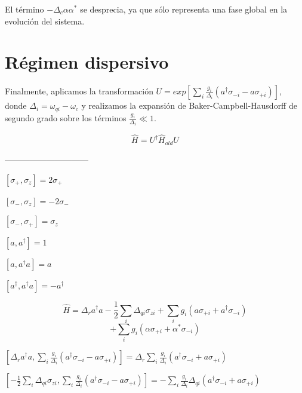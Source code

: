 \documentclass[11pt, spanish]{report}
\begin{document}
El término $-\Delta_c \alpha \alpha^*$ se desprecia, ya que sólo representa una fase global en la evolución del sistema.

\section{Régimen dispersivo}

Finalmente, aplicamos la transformación $U = exp[\sum\limits_i \frac{g_i}
{\Delta_i} (a^\dagger \sigma_{-i} - a \sigma_{+i})]$, donde $\Delta_i =
\omega_{qi} - \omega_c$ y realizamos la expansión de Baker-Campbell-Hausdorff de segundo grado sobre los términos $\frac{g_i}{\Delta_i} \ll 1$.

$$\hat{H} = U^\dagger \hat{H}_{old} U$$

------------------------------

$[\sigma_+, \sigma_z] = 2 \sigma_+$

$[\sigma_-, \sigma_z] = - 2 \sigma_-$

$[\sigma_-, \sigma_+] = \sigma_z$

$[a, a^\dagger] = 1$

$[a, a^\dagger a] = a$

$[a^\dagger, a^\dagger a] = -a^\dagger$

$$\hat{H} = \Delta_r a^\dagger a - \frac{1}{2} \sum\limits_i \Delta_{qi} \sigma_{zi} + \sum\limits_i g_i (a \sigma_{+i} + a^\dagger \sigma_{-i})$$
$$ + \sum\limits_i g_i (\alpha \sigma_{+i} + \alpha^* \sigma_{-i})$$

$[\Delta_r a^\dagger a, \sum\limits_i \frac{g_i} {\Delta_i} (a^\dagger
\sigma_{-i} - a \sigma_{+i})] = \Delta_r \sum\limits_i \frac{g_i} {\Delta_i} (a^\dagger \sigma_{-i} + a \sigma_{+i})$

$[- \frac{1}{2} \sum\limits_i \Delta_{qi} \sigma_{zi}, \sum\limits_i \frac{g_i} {\Delta_i} (a^\dagger \sigma_{-i} - a \sigma_{+i})] = 
- \sum\limits_i \frac{g_i} {\Delta_i} \Delta_{qi} (a^\dagger \sigma_{-i} + a \sigma_{+i}) $
\end{document}
